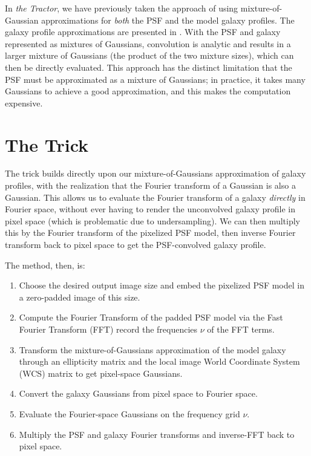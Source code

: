 \documentclass[11pt,preprint]{aastex}
\newcommand{\project}[1]{\textsl{#1}}
\begin{document}
In \project{the Tractor}, we have previously taken the approach of
using mixture-of-Gaussian approximations for \emph{both} the PSF and
the model galaxy profiles.  The galaxy profile approximations are
presented in \cite{moggalaxy}.  With the PSF and galaxy represented as
mixtures of Gaussians, convolution is analytic and results in a larger
mixture of Gaussians (the product of the two mixture sizes), which can
then be directly evaluated.  This approach has the distinct limitation
that the PSF must be approximated as a mixture of Gaussians; in
practice, it takes many Gaussians to achieve a good approximation, and
this makes the computation expensive.

\section{The Trick}

The trick builds directly upon our mixture-of-Gaussians approximation
of galaxy profiles, with the realization that the Fourier transform of
a Gaussian is also a Gaussian.  This allows us to evaluate the Fourier
transform of a galaxy \emph{directly} in Fourier space, without ever
having to render the unconvolved galaxy profile in pixel space (which
is problematic due to undersampling).  We can then multiply this by
the Fourier transform of the pixelized PSF model, then inverse Fourier
transform back to pixel space to get the PSF-convolved galaxy profile.

The method, then, is:
\begin{enumerate}
\item Choose the desired output image size and embed the pixelized PSF
  model in a zero-padded image of this size.
\item Compute the Fourier Transform of the padded PSF model via the
  Fast Fourier Transform (FFT)
  record the frequencies $\nu$ of the FFT terms.
\item Transform the mixture-of-Gaussians approximation of the model
  galaxy through an ellipticity matrix and the local image World
  Coordinate System (WCS) matrix to get pixel-space Gaussians.
\item Convert the galaxy Gaussians from pixel space to Fourier space.
\item Evaluate the Fourier-space Gaussians on the frequency grid $\nu$.
\item Multiply the PSF and galaxy Fourier transforms and inverse-FFT
  back to pixel space.
\end{enumerate}
\end{document}
